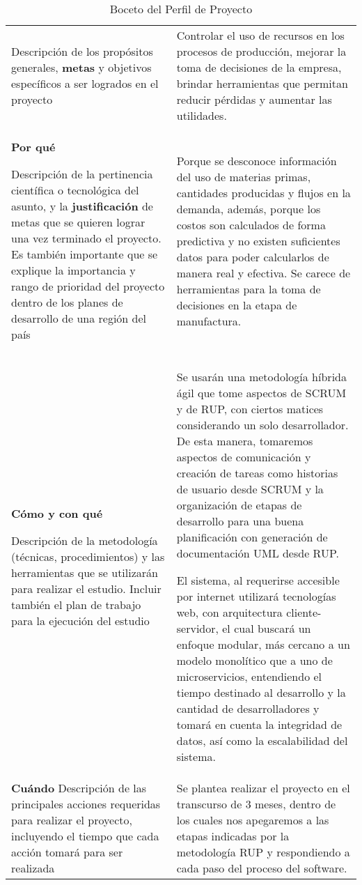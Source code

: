 \begin{table}[htbp]
\begin{tabular}{p{}p{}}
		{\tiny Descripción de los propósitos generales, \textbf{metas} y objetivos específicos a ser logrados en el proyecto} &

		Controlar el uso de recursos en los procesos de producción, mejorar la toma de decisiones de la empresa, brindar herramientas que permitan reducir pérdidas y aumentar las utilidades. \\

		\textbf{Por qué}

		{\tiny Descripción de la pertinencia científica o tecnológica del asunto, y la \textbf{justificación} de metas que se quieren lograr una vez terminado el proyecto. Es también importante que se explique la importancia y rango de prioridad del proyecto dentro de los planes de desarrollo de una región del país} &

		Porque se desconoce información del uso de materias primas, cantidades producidas y flujos en la demanda, además, porque los costos son calculados de forma predictiva y no existen suficientes datos para poder calcularlos de manera real y efectiva. Se carece de herramientas para la toma de decisiones en la etapa de manufactura. \\

		\textbf{Cómo y con qué}

		{\tiny Descripción de la metodología (técnicas, procedimientos) y las herramientas que se utilizarán para realizar el estudio. Incluir también el plan de trabajo para la ejecución del estudio} &

		Se usarán una metodología híbrida ágil que tome aspectos de SCRUM y de RUP, con ciertos matices considerando un solo desarrollador. De esta manera, tomaremos aspectos de comunicación y creación de tareas como historias de usuario desde SCRUM y la organización de etapas de desarrollo para una buena planificación con generación de documentación UML desde RUP.

		El sistema, al requerirse accesible por internet utilizará tecnologías web, con arquitectura cliente-servidor, el cual buscará un enfoque modular, más cercano a un modelo monolítico que a uno de microservicios, entendiendo el tiempo destinado al desarrollo y la cantidad de desarrolladores y tomará en cuenta la integridad de datos, así como la escalabilidad del sistema. \\

		\textbf{Cuándo}
		{\tiny Descripción de las principales acciones requeridas para realizar el proyecto, incluyendo el tiempo que cada acción tomará para ser realizada} &

		Se plantea realizar el proyecto en el transcurso de 3 meses, dentro de los cuales nos apegaremos a las etapas indicadas por la metodología RUP y respondiendo a cada paso del proceso del software. \\
		\bottomrule
	\end{tabular}
	\caption{Boceto del Perfil de Proyecto}
	\label{table: boceto}
\end{table}
